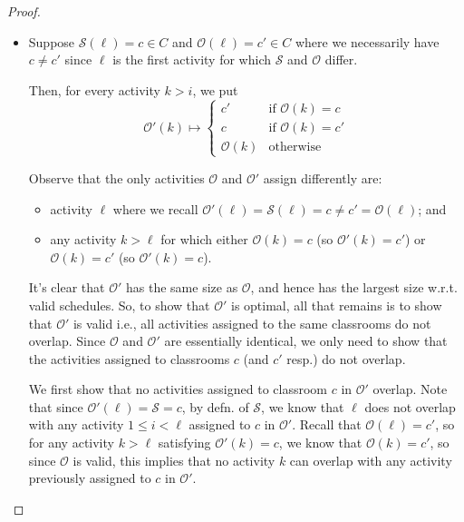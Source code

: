 \documentclass{article}
\theoremstyle{plain}%
\theoremstyle{definition}
\theoremstyle{remark}
\begin{document}
\begin{proof}
\begin{itemize}
            \item Suppose $\mathcal{S}(\ell) = c \in C$
                and $\mathcal{O}(\ell) = c' \in C$ where we necessarily have $c
                \neq c'$ since $\ell$ is the first activity for which
                $\mathcal{S}$ and $\mathcal{O}$ differ.

            Then, for every activity $k > i$, we put
            \begin{equation}
                \mathcal{O}'(k) \mapsto
                    \begin{cases}
                        c' & \text{if $\mathcal{O}(k) = c$} \\
                        c & \text{if $\mathcal{O}(k) = c'$} \\
                        \mathcal{O}(k) & \text{otherwise}
                    \end{cases}
            \end{equation}

            Observe that the only activities $\mathcal{O}$ and $\mathcal{O}'$
                assign differently are:
            \begin{itemize}
                \item activity $\ell$ where we recall $\mathcal{O}'(\ell) = \mathcal{S}(\ell) =c \neq c' = \mathcal{O}(\ell)$; and
                \item any activity $k > \ell$ for which either 
                    $\mathcal{O}(k) = c$ (so $\mathcal{O}'(k) = c'$)
                    or $\mathcal{O}(k) =c'$ (so $\mathcal{O}'(k) = c$).
            \end{itemize}

            It's clear that $\mathcal{O}'$ has the same size as $\mathcal{O}$,
                and hence has the largest size w.r.t. valid schedules.
            So, to show that $\mathcal{O}'$ is optimal, all that remains is to
                show that $\mathcal{O}'$ is valid i.e., all activities assigned
                to the same classrooms do not overlap.
            Since $\mathcal{O}$ and $\mathcal{O}'$ are essentially identical,
                we only need to show that the activities assigned to classrooms
                $c$ (and $c'$ resp.)
                do not overlap.

            We first show that no activities assigned to classroom $c$
                in $\mathcal{O}'$ overlap.
            Note that since $\mathcal{O}'(\ell) = \mathcal{S} = c$,
                by defn. of $\mathcal{S}$,
                    we know that $\ell$ does not overlap with any activity 
                    $1 \le i < \ell$ assigned to $c$ in $\mathcal{O}'$.
            Recall that $\mathcal{O}(\ell) = c'$, so for any activity $k > \ell$ 
                satisfying $\mathcal{O}'(k) = c$, we know that $\mathcal{O}(k) = c'$,
                so since $\mathcal{O}$ is valid, this implies that no activity
                $k$ can overlap with any activity previously assigned to $c$ in
                $\mathcal{O}'$.


\end{itemize}
\end{proof}
\end{document}
